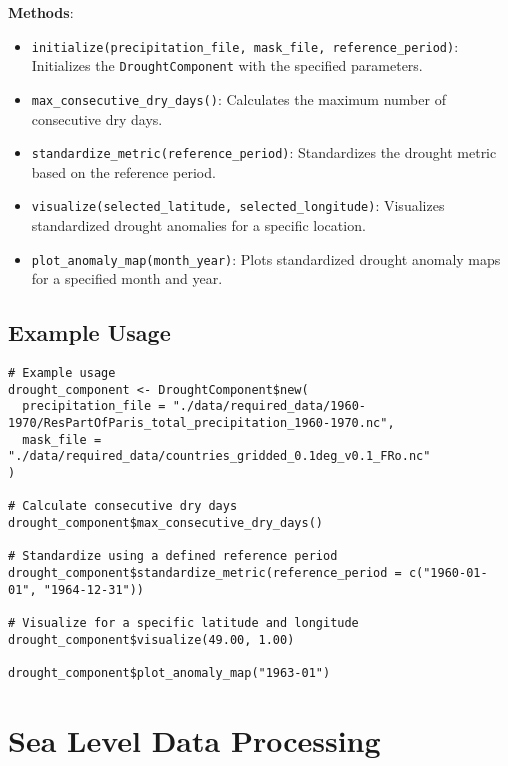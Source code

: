 \documentclass[a4paper,12pt]{article}
\begin{document}
\textbf{Methods}:

\begin{itemize}
    \item \texttt{initialize(precipitation\_file, mask\_file, reference\_period)}:
        Initializes the \texttt{DroughtComponent} with the specified parameters.
    
    \item \texttt{max\_consecutive\_dry\_days()}:
        Calculates the maximum number of consecutive dry days.

    \item \texttt{standardize\_metric(reference\_period)}:
        Standardizes the drought metric based on the reference period.
    
    \item \texttt{visualize(selected\_latitude, selected\_longitude)}:
        Visualizes standardized drought anomalies for a specific location.
    
    \item \texttt{plot\_anomaly\_map(month\_year)}:
        Plots standardized drought anomaly maps for a specified month and year.
\end{itemize}

\subsection{Example Usage}

\begin{verbatim}
# Example usage
drought_component <- DroughtComponent$new(
  precipitation_file = "./data/required_data/1960-1970/ResPartOfParis_total_precipitation_1960-1970.nc",
  mask_file = "./data/required_data/countries_gridded_0.1deg_v0.1_FRo.nc"
)

# Calculate consecutive dry days
drought_component$max_consecutive_dry_days()

# Standardize using a defined reference period
drought_component$standardize_metric(reference_period = c("1960-01-01", "1964-12-31"))

# Visualize for a specific latitude and longitude
drought_component$visualize(49.00, 1.00)

drought_component$plot_anomaly_map("1963-01")
\end{verbatim}

\section{Sea Level Data Processing}
\label{sec:sealevel}
\end{document}
